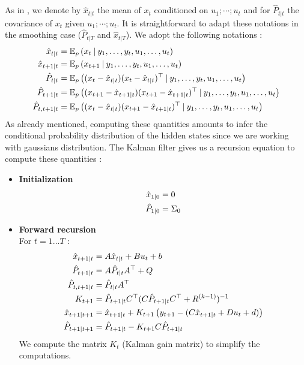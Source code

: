 As in \cite{Poly}, we denote by $\hat{x}_{t|t}$ the mean of $x_t$ conditioned on $u_1;\cdots;u_t$ and for $\hat{P}_{t|t}$ the covariance of $x_t$ given $u_1;\cdots;u_t$. It is straightforward to adapt these notations in the smoothing case ($\hat{P}_{t|T}$ and $\hat{x}_{t|T}$).
We adopt the following notations :
\begin{align*}
  \hat{x}_{t \mathbin{\vert} t} &= \mathbb{E}_p \left(x_t \mathbin{\vert} y_1, \ldots , y_t, u_1, \ldots , u_t \right) \\
  \hat{x}_{t+1 \mathbin{\vert} t} &= \mathbb{E}_p \left(x_{t+1} \mathbin{\vert} y_1, \ldots , y_t, u_1, \ldots , u_t \right) \\
  \hat{P}_{t \mathbin{\vert} t} &= \mathbb{E}_p \left((x_t - \hat{x}_{t \mathbin{\vert} t})(x_t - \hat{x}_{t \mathbin{\vert} t})^{\top} \mathbin{\vert} y_1, \ldots , y_t, u_1, \ldots , u_t \right) \\
  \hat{P}_{t+1 \mathbin{\vert} t} &= \mathbb{E}_p \left((x_{t+1} - \hat{x}_{t+1 \mathbin{\vert} t})(x_{t+1} - \hat{x}_{t+1 \mathbin{\vert} t})^{\top} \mathbin{\vert} y_1, \ldots , y_t, u_1, \ldots , u_t \right) \\
  \hat{P}_{t,t+1 \mathbin{\vert} t} &= \mathbb{E}_p \left((x_t - \hat{x}_{t \mathbin{\vert} t})(x_{t+1} - \hat{x}_{t+1 \mathbin{\vert} t})^{\top} \mathbin{\vert} y_1, \ldots , y_t, u_1, \ldots , u_t \right) \\
\end{align*}
As already mentioned, computing these quantities amounts to infer the conditional probability distribution of the hidden states since we are working with gaussians distribution. The Kalman filter gives us a recursion equation to compute these quantities :
\begin{itemize}
  \item \textbf{Initialization}\\
    \begin{align*}
      \hat{x}_{1 \mathbin{\vert} 0} &= 0\\
      \hat{P}_{1 \mathbin{\vert} 0} &= \Sigma_0\\
    \end{align*}
  \item \textbf{Forward recursion}\\
    For $t=1 \ldots T$ :
    \begin{align*}
      \hat{x}_{t+1 \mathbin{\vert} t} &= A \hat{x}_{t \mathbin{\vert} t} + B u_t + b\\
      \hat{P}_{t+1 \mathbin{\vert} t} &= A \hat{P}_{t \mathbin{\vert} t} A^{\top} + Q\\
      \hat{P}_{t,t+1 \mathbin{\vert} t} &= \hat{P}_{t \mathbin{\vert} t}A^{\top}\\
      K_{t+1} &= \hat{P}_{t+1 \mathbin{\vert} t}C^{\top}(C \hat{P}_{t+1 \mathbin{\vert} t} C^{\top} + R^{(k-1)})^{-1}\\
      \hat{x}_{t+1 \mathbin{\vert} t+1} &= \hat{x}_{t+1 \mathbin{\vert} t} + K_{t+1} \left(y_{t+1} - (C\hat{x}_{t+1 \mathbin{\vert} t} + D u_t + d) \right)\\
      \hat{P}_{t+1 \mathbin{\vert} t+1} &= \hat{P}_{t+1 \mathbin{\vert} t} - K_{t+1} C \hat{P}_{t+1 \mathbin{\vert} t}\\
    \end{align*}
We compute the matrix $K_{t}$ (Kalman gain matrix) to simplify the computations.
\end{itemize}

